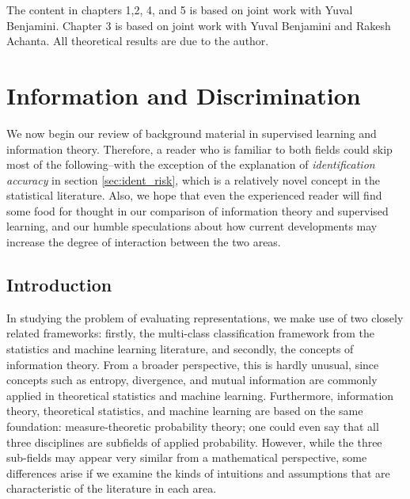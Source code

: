 The content in chapters 1,2, 4, and 5 is based on joint work with
Yuval Benjamini.  Chapter 3 is based on joint work with Yuval
Benjamini and Rakesh Achanta.  All theoretical results are due to the
author.

\section{Information and Discrimination}


We now begin our review of background material in supervised learning
and information theory.  Therefore, a reader who is familiar to both
fields could skip most of the following--with the exception of the
explanation of \emph{identification accuracy} in section
\ref{sec:ident_risk}, which is a relatively novel concept in
the statistical literature.  Also, we hope that even the experienced
reader will find some food for thought in our comparison of
information theory and supervised learning, and our humble
speculations about how current developments may increase the degree of
interaction between the two areas.

\subsection{Introduction}

In studying the problem of evaluating representations, we make use of
two closely related frameworks: firstly, the multi-class
classification framework from the statistics and machine learning
literature, and secondly, the concepts of information theory.  From a
broader perspective, this is hardly unusual, since concepts such as
entropy, divergence, and mutual information are commonly applied in
theoretical statistics and machine learning.  Furthermore, information
theory, theoretical statistics, and machine learning are based on the
same foundation: measure-theoretic probability theory; one could even
say that all three disciplines are subfields of applied probability.
However, while the three sub-fields may appear very similar from a
mathematical perspective, some differences arise if we examine the
kinds of intuitions and assumptions that are characteristic of the
literature in each area.

